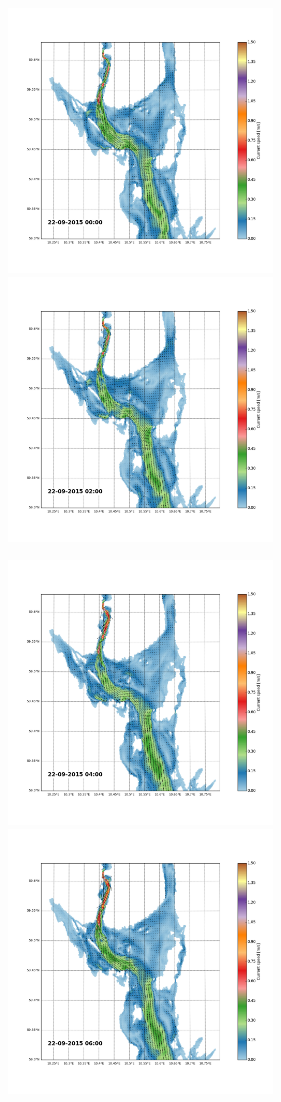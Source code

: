 \documentclass[12pt,a4paper,english]{article}
\begin{document}
\begin{figure}[h]
\centerline{
\includegraphics*[trim=2.0cm 3cm 6.0cm 3.5cm,clip=true,height=7cm]{Python/stromfelt_22}
\includegraphics*[trim=3.7cm 3cm 1.3cm 3.5cm,clip=true,height=7cm]{Python/stromfelt_24}
}
\centerline{
\includegraphics*[trim=2.0cm 3cm 6.0cm 3.5cm,clip=true,height=7cm]{Python/stromfelt_26}
\includegraphics*[trim=3.7cm 3cm 1.3cm 3.5cm,clip=true,height=7cm]{Python/stromfelt_28}
}
\end{figure}
\end{document}
